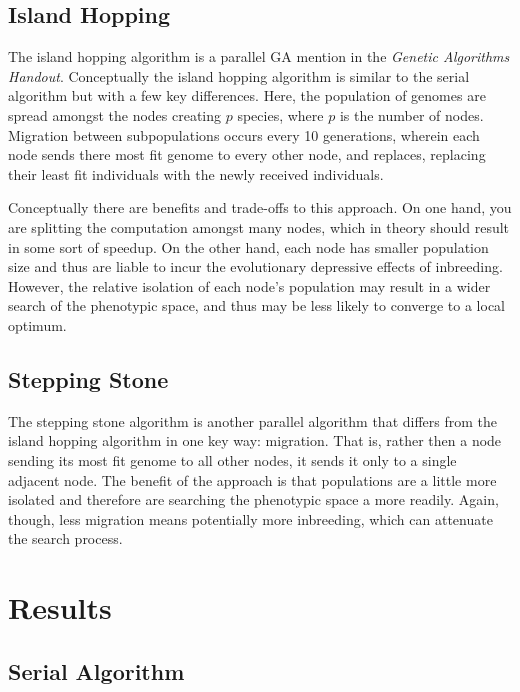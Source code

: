 \documentclass[11pt]{article}
\begin{document}
\subsection{Island Hopping}
\label{sec:orgf03b9bf}

The island hopping algorithm is a parallel GA mention in the \emph{Genetic Algorithms Handout}. Conceptually the island hopping algorithm is similar to the serial algorithm but with a few key differences. Here, the population of genomes are spread amongst the nodes creating \(p\) species, where \(p\) is the number of nodes. Migration between subpopulations occurs every 10 generations, wherein each node sends there most fit genome to every other node, and replaces, replacing their least fit individuals with the newly received individuals.

Conceptually there are benefits and trade-offs to this approach. On one hand, you are splitting the computation amongst many nodes, which in theory should result in some sort of speedup. On the other hand, each node has smaller population size and thus are liable to incur the evolutionary depressive effects of inbreeding. However, the relative isolation of each node's population may result in a wider search of the phenotypic space, and thus may be less likely to converge to a local optimum.

\subsection{Stepping Stone}
\label{sec:org210e780}

The stepping stone algorithm is another parallel algorithm that differs from the island hopping algorithm in one key way: migration. That is, rather then a node sending its most fit genome to all other nodes, it sends it only to a single adjacent node. The benefit of the approach is that populations are a little more isolated and therefore are searching the phenotypic space a more readily. Again, though, less migration means potentially more inbreeding, which can attenuate the search process.

\section{Results}
\label{sec:org348ac4b}
\subsection{Serial Algorithm}
\label{sec:orga61570b}
\end{document}
